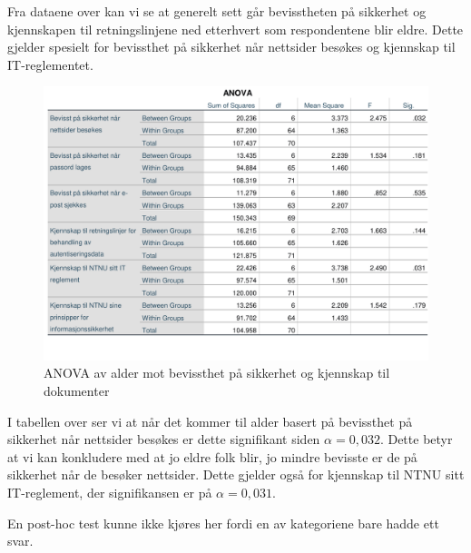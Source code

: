 Fra dataene over kan vi se at generelt sett går bevisstheten på sikkerhet og kjennskapen til retningslinjene ned etterhvert som respondentene blir eldre. Dette gjelder spesielt for bevissthet på sikkerhet når nettsider besøkes og kjennskap til IT-reglementet. 

\begin{figure}[H]
    \centering
    \includegraphics[scale=0.7]{case_2/bilder/spss/anova_ttest/alder_bevissthetogkjennskap_anova.pdf}
    \caption[ANOVA av alder mot bevissthet på sikkerhet og kjennskap til retningslinjer]{ANOVA av alder mot bevissthet på sikkerhet og kjennskap til dokumenter}
    \label{fig:alder-bevissthetogkjennskap-ANOVA}
\end{figure}

I tabellen over ser vi at når det kommer til alder basert på bevissthet på sikkerhet når nettsider besøkes er dette signifikant siden \(\alpha = 0,032\). Dette betyr at vi kan konkludere med at jo eldre folk blir, jo mindre bevisste er de på sikkerhet når de besøker nettsider. Dette gjelder også for kjennskap til NTNU sitt IT-reglement, der signifikansen er på \(\alpha = 0,031\). 

En post-hoc test kunne ikke kjøres her fordi en av kategoriene bare hadde ett svar. 

